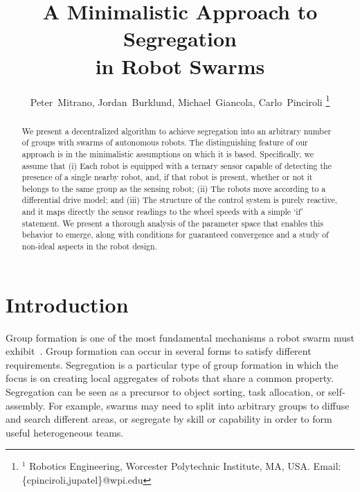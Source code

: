 \documentclass[letterpaper, 10 pt, conference]{ieeeconf}
\begin{document}
\title{\LARGE \bf
  A Minimalistic Approach to Segregation\\
  in Robot Swarms}

\author{
    Peter~Mitrano,
    Jordan~Burklund,
    Michael~Giancola,
    Carlo~Pinciroli%
\thanks{$^{1}$ Robotics Engineering, Worcester Polytechnic Institute, MA, USA. Email: {\sf \{cpinciroli,jupatel\}@wpi.edu}}%
}

\maketitle
\thispagestyle{empty}
\pagestyle{empty}

\begin{abstract}
  We present a decentralized algorithm to achieve segregation into an arbitrary
  number of groups with swarms of autonomous robots. The distinguishing feature
  of our approach is in the minimalistic assumptions on which it is
  based. Specifically, we assume that (i) Each robot is equipped with a ternary
  sensor capable of detecting the presence of a single nearby robot, and, if
  that robot is present, whether or not it belongs to the same group as the
  sensing robot; (ii) The robots move according to a differential drive model;
  and (iii) The structure of the control system is purely reactive, and it maps
  directly the sensor readings to the wheel speeds with a simple `if' statement.
  We present a thorough analysis of the parameter space
  that enables this behavior to emerge, along with conditions for guaranteed
  convergence and a study of non-ideal aspects in the robot design.
\end{abstract}


\section{Introduction}

Group formation is one of the most fundamental mechanisms a robot swarm must
exhibit~\cite{Brambilla2013}. Group formation can occur in several forms to
satisfy different requirements. Segregation is a particular type of group
formation in which the focus is on creating local aggregates of robots that
share a common property. Segregation can be seen as a precursor to object
sorting, task allocation, or self-assembly. For example, swarms may need to
split into arbitrary groups to diffuse and search different areas, or segregate
by skill or capability in order to form useful heterogeneous teams.
\end{document}
